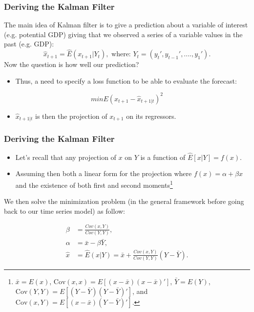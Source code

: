 \documentclass[notes=show]{beamer}%
\begin{document}
\begin{frame}
\frametitle{Deriving the Kalman Filter}


The main idea of Kalman filter is to give a prediction about a variable of interest (e.g. potential GDP) giving that we observed a series of a variable values in the past (e.g. GDP):
\begin{equation}
\hat{x}_{t+1}= \hat{E}(x_{t+1}|Y_{t}), \text{ where:  } Y_{t}=(y_{t}',y_{t-1}',....,y_{1}').
\end{equation}
Now the question is how well our prediction? 
\begin{itemize}
\item Thus, a need to specify a loss function to be able to evaluate the forecast:
\end{itemize}
\begin{equation}
minE(x_{t+1}-\hat{x}_{t+1|t})^{2} \label{loss function eq}%
\end{equation}
\begin{itemize}
\item $\hat{x}_{t+1|t}$ is then the projection of $x_{t+1}$ on its regressors.
\end{itemize}

\end{frame}


\begin{frame}
\frametitle{Deriving the Kalman Filter}

\begin{itemize}
\item Let's recall that any projection of $x$ on $Y$ is a function of $\hat{E}[x|Y]=f(x)$. 
\item Assuming then both a linear form for the projection where $f(x)=\alpha+\beta x$ and the existence of both first and second moments\footnote{$\bar{x}=E(x)$, $\text{Cov}(x,x)=E[(x-\bar{x})(x-\bar{x})']$, $\bar{Y}=E(Y)$, $\text{Cov}(Y,Y)=E[(Y-\bar{Y})(Y-\bar{Y})']$, and $\text{Cov}(x,Y)=E[(x-\bar{x})(Y-\bar{Y})']$.}
\end{itemize}

We then solve the minimization problem (in the general framework before going back to our time series model) as follow: 

\begin{align}
\beta&=\frac{Cov(x,Y)}{Cov(Y,Y)},\\
\alpha&=\bar{x}-\beta \bar{Y},\\
\hat{x}&=\hat{E}(x|Y)=\bar{x}+\frac{Cov(x,Y)}{Cov(Y,Y)}(Y-\bar{Y}).
\end{align}

\end{frame}
\end{document}
